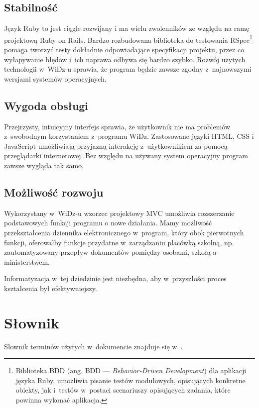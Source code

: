 \documentclass[12pt,leqno,twoside]{mwart}
\begin{document}
\subsection{Stabilność}
\noindent Język Ruby to jest ciągle rozwijany i ma wielu zwolenników ze względu na ramę projektową Ruby on Rails. Bardzo rozbudowana biblioteka do testowania RSpec\footnote{Biblioteka BDD (ang. BDD --- \textit{Behavior-Driven Development}) dla aplikacji języka Ruby, umożliwia pisanie testów modułowych, opisujących konkretne obiekty, jak i~testów w~postaci scenariuszy opisujących zadania, które powinna wykonać aplikacja.} pomaga tworzyć testy dokładnie odpowiadające specyfikacji projektu, przez co wyłapywanie błędów i~ich naprawa odbywa się bardzo szybko. Rozwój użytych technologii w~WiDz-u sprawia, że program będzie zawsze zgodny z~najnowszymi wersjami systemów operacyjnych.

\subsection{Wygoda obsługi}
\noindent Przejrzysty, intuicyjny interfejs sprawia, że użytkownik nie ma problemów z~swobodnym korzystaniem z~programu WiDz. Zastosowane języki HTML, CSS i JavaScript umożliwiają przyjazną interakcję z~użytkownikiem za pomocą przeglądarki internetowej. Bez względu na używany system operacyjny program zawsze wygląda tak samo.

\subsection{Możliwość rozwoju}
\noindent Wykorzystany w~WiDz-u wzorzec projektowy MVC umożliwia rozszerzanie podstawowych funkcji programu o nowe działania. Mamy możliwość przekształcenia dziennika elektronicznego w~program, który obok pierwotnych funkcji, oferowałby funkcje przydatne w~zarządzaniu placówką szkolną, np. zautomatyzowany przepływ dokumentów pomiędzy osobami, szkołą a ministerstwem.

\indent Informatyzacja w~tej dziedzinie jest niezbędna, aby w~przyszłości proces kształcenia był efektywniejszy.

\section{Słownik}
\noindent Słownik terminów użytych w~dokumencie znajduje się w~\cite{SLO}.
\end{document}
